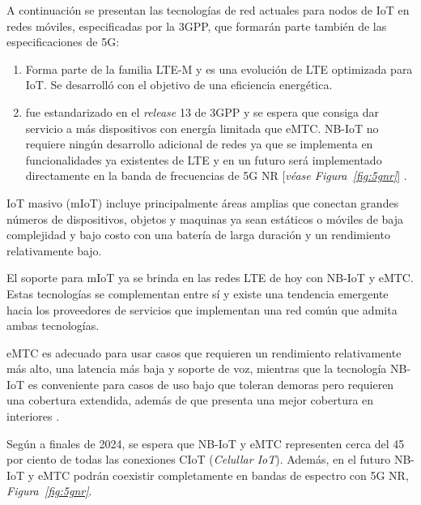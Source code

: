 A continuación se presentan las tecnologías de red actuales para nodos de IoT en redes móviles, especificadas por la 3GPP, que formarán parte también de las especificaciones de 5G:
\begin{enumerate}
    \item \textit{} Forma parte de la familia LTE-M y es una evolución de LTE optimizada para IoT. Se desarrolló con el objetivo de una eficiencia energética.
    \item \textit{} fue estandarizado en el \textit{release }13 de 3GPP y se espera que consiga dar servicio a más dispositivos con energía limitada que eMTC. NB-IoT no requiere ningún desarrollo adicional de redes ya que se implementa en funcionalidades ya existentes de LTE \parencite{NetTrafficIoT} y en un futuro será implementado directamente en la banda de frecuencias de 5G NR [\textit{véase Figura~\ref{fig:5gnr}}] \parencite{EricssonAB2016}.
\end{enumerate}

IoT masivo (mIoT) incluye principalmente áreas amplias que conectan grandes números de dispositivos, objetos y maquinas ya sean estáticos o móviles de baja complejidad y bajo costo con una batería de larga duración y un rendimiento relativamente bajo. \newline

El soporte para mIoT ya se brinda en las redes LTE de hoy con NB-IoT y eMTC. Estas tecnologías se complementan entre sí y existe una tendencia emergente hacia los proveedores de servicios que implementan una red común que admita ambas tecnologías.\newline

eMTC es adecuado para usar casos que requieren un rendimiento relativamente más alto, una latencia más baja y soporte de voz, mientras que la tecnología NB-IoT es conveniente para casos de uso bajo que toleran demoras pero requieren una cobertura extendida, además de que presenta una mejor cobertura en interiores \parencite{EricssonAB2016}. \newline

Según \parencite{Ericsson2019} a finales de 2024, se espera que NB-IoT y eMTC representen cerca del 45 por ciento de todas las conexiones CIoT (\textit{Celullar IoT}). Además, en el futuro NB-IoT y eMTC podrán coexistir completamente en bandas de espectro con 5G NR, \textit{Figura~\ref{fig:5gnr}}.\newline

